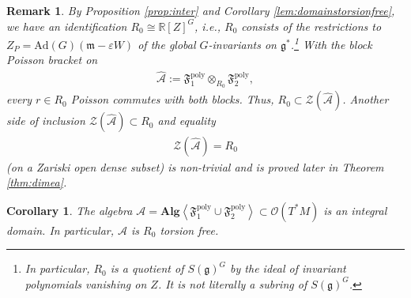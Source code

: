 \documentclass[11pt]{amsart}
\theoremstyle{definition}
\theoremstyle{plain}
\newtheorem{corollary}[theorem]{Corollary}
\newtheorem{remark}[theorem]{Remark}
\theoremstyle{conclusion}
\begin{document}
 \begin{remark}
 \label{re:poisscenter}
By Proposition \ref{prop:inter} and Corollary \ref{lem:domainstorsionfree}, we have an identification  $ R_0      \cong \mathbb{R}[Z]^G$, i.e., $R_0$ consists of the restrictions to $Z_P=\mathrm{Ad}(G)(\mathfrak{m}-\varepsilon W)$ of the global $G$-invariants on $\mathfrak{g}^*$.\footnote{In particular, $R_0$ is a quotient of $S(\mathfrak{g})^G$ by the ideal of invariant polynomials vanishing on $Z$. It is not literally a subring of $S(\mathfrak{g})^G$.} With the block Poisson bracket on  \begin{align*}
    \widehat{\mathcal{A}} :=  \mathfrak{F}_1^{\mathrm{poly}} \otimes_{R_0} \mathfrak{F}_2^{\mathrm{poly}},  
\end{align*} every $r\in R_0$ Poisson commutes with both blocks. Thus,   $R_0  \subset \mathcal{Z}( \widehat{\mathcal{A}} )$.  Another side of inclusion $\mathcal{Z}( \widehat{\mathcal{A}} ) \subset R_0$ and equality  \begin{align*}
   \mathcal{Z}( \widehat{\mathcal{A}} ) =  R_0 
\end{align*} (on a Zariski open dense subset) is non-trivial and is proved later in Theorem \ref{thm:dimea}. %
\end{remark}


\begin{corollary}
\label{cor:A-torsion free}
The algebra $\mathcal{A}=\textbf{Alg} \left\langle \mathfrak{F}_1^{\mathrm{poly}}\cup \mathfrak{F}_2^{\mathrm{poly}} \right\rangle\subset \mathcal{O}(T^*M)$ is an integral domain. In particular, $\mathcal{A}$ is $R_0$ torsion free.
\end{corollary}
\end{document}
